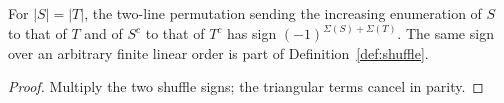 \begin{theorem}[Lemma 3.2]
\label{thm:fin-32}
\leanok
{}
For $|S|=|T|$, the two-line permutation sending the increasing enumeration of $S$ to that
of $T$ and of $S^c$ to that of $T^c$ has sign $(-1)^{\Sigma(S)+\Sigma(T)}$.
The same sign over an arbitrary finite linear order is part of
Definition~\ref{def:shuffle}.
\end{theorem}
\begin{proof}
\leanok
Multiply the two shuffle signs; the triangular terms cancel in parity.
\end{proof}
